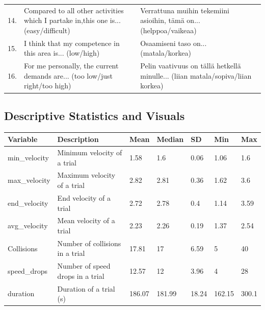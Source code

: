 \documentclass{article}
\begin{document}
\begin{minipage}{\textwidth}
\begin{tabular}{l p{} p{}}
\\
14. & Compared to all other activities which I partake in,this one is... (easy/difficult) & Verrattuna muihin tekemiini asioihin, t\"{a}m\"{a} on... (helppoa/vaikeaa) \\
15. & I think that my competence in this area is... (low/high)  & Osaamiseni taso on... (matala/korkea)\\
16. & For me personally, the current demands are... (too low/just right/too high) & Pelin vaativuus on t\"{a}ll\"{a} hetkell\"{a} minulle... (liian matala/sopiva/liian korkea)\\
\end{tabular}
\end{minipage}


\subsection*{Descriptive Statistics and Visuals}

\begin{minipage}{\textwidth}
\centering
{}
\begin{tabular}{lllllll}
\hline
Variable & Description & Mean & Median & SD & Min & Max \\
\hline
min\_velocity & Minimum velocity of a trial & 1.58 & 1.6 & 0.06 & 1.06 & 1.6 \\
max\_velocity & Maximum velocity of a trial & 2.82 & 2.81 & 0.36 & 1.62 & 3.6 \\
end\_velocity & End velocity of a trial & 2.72 & 2.78 & 0.4 & 1.14 & 3.59 \\
avg\_velocity & Mean velocity of a trial & 2.23 & 2.26 & 0.19 & 1.37 & 2.54 \\
Collisions & Number of collisions in a trial & 17.81 & 17 & 6.59 & 5 & 40 \\
speed\_drops & Number of speed drops in a trial & 12.57 & 12 & 3.96 & 4 & 28 \\
duration & Duration of a trial (s) & 186.07 & 181.99 & 18.24 & 162.15 & 300.1 \\
\hline
\end{tabular}
\end{minipage}
\end{document}
